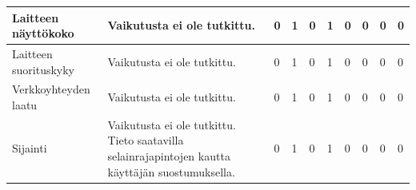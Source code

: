 \documentclass[finnish, 12pt, a4paper, elec, utf8, a-1b, online]{aaltothesis}
\begin{document}
{\begin{longtable}{p{2.5cm}|p{6cm}|p{0.5cm}p{0.5cm}p{0.5cm}|p{0.5cm}|p{0.5cm}p{0.5cm}p{0.5cm}|p{0.5cm}|}
        \midrule
        Laitteen näyttökoko                    & Vaikutusta ei ole tutkittu.                                                                                                                                                                                                                                                                                              & 0                                          & 1                                   & 0                                      & 1                            & 0                                               & 0                                         & 0                                         & 0                            \\
        \midrule
        Laitteen suorituskyky                  & Vaikutusta ei ole tutkittu.                                                                                                                                                                                                                                                                                              & 0                                          & 1                                   & 0                                      & 1                            & 0                                               & 0                                         & 0                                         & 0                            \\
        \midrule
        Verkkoyhteyden laatu                   & Vaikutusta ei ole tutkittu.                                                                                                                                                                                                                                                                                              & 0                                          & 1                                   & 0                                      & 1                            & 0                                               & 0                                         & 0                                         & 0                            \\
        \midrule
        Sijainti                               & Vaikutusta ei ole tutkittu. Tieto saatavilla selainrajapintojen kautta käyttäjän suostumuksella.                                                                                                                                                                                                                         & 0                                          & 1                                   & 0                                      & 1                            & 0                                               & 0                                         & 0                                         & 0                            \\

\end{longtable}}
\end{document}
